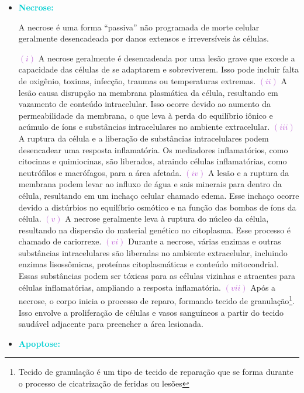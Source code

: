 \documentclass[11pt,a4paper]{article}
\begin{document}
	\begin{itemize}[label=\textcolor{CarnationPink}{$\blacktriangleright$}]
		\item \textcolor{DarkTurquoise}{\LobsterTwo\Large\textbf{Necrose:}}
		
		A necrose é uma forma ``passiva'' não programada de morte celular geralmente desencadeada por danos extensos e irreversíveis às células.

		\textcolor{MediumOrchid}{$(i)$} A necrose geralmente é desencadeada por uma lesão  grave que excede a capacidade das células de se adaptarem e sobreviverem. Isso pode incluir falta de oxigênio, toxinas, infecção, traumas ou temperaturas extremas. \textcolor{MediumOrchid}{$(ii)$} A lesão causa disrupção na membrana plasmática da célula, resultando em vazamento de conteúdo intracelular. Isso ocorre devido ao aumento da permeabilidade da membrana, o que leva à perda do equilíbrio iônico e acúmulo de íons e substâncias intracelulares no ambiente extracelular. \textcolor{MediumOrchid}{$(iii)$} A ruptura da célula e a liberação de substâncias intracelulares podem desencadear uma resposta inflamatória. Os mediadores inflamatórios, como citocinas e quimiocinas, são liberados, atraindo células inflamatórias, como neutrófilos e macrófagos, para a área afetada. \textcolor{MediumOrchid}{$(iv)$} A lesão e a ruptura da membrana podem levar ao influxo de água e sais minerais para dentro da célula, resultando em um inchaço celular chamado edema. Esse inchaço ocorre devido a distúrbios no equilíbrio osmótico e na função das bombas de íons da célula. \textcolor{MediumOrchid}{$(v)$} A necrose geralmente leva à ruptura do núcleo da célula, resultando na dispersão do material genético no citoplasma. Esse processo é chamado de cariorrexe. \textcolor{MediumOrchid}{$(vi)$}  Durante a necrose, várias enzimas e outras substâncias intracelulares são liberadas no ambiente extracelular, incluindo enzimas lisossômicas, proteínas citoplasmáticas e conteúdo mitocondrial. Essas substâncias podem ser tóxicas para as células vizinhas e atraentes para células inflamatórias, ampliando a resposta inflamatória. \textcolor{MediumOrchid}{$(vii)$} Após a necrose, o corpo inicia o processo de reparo, formando tecido de granulação\footnote{Tecido de granulação é um tipo de tecido de reparação que se forma durante o processo de cicatrização de feridas ou lesões}. Isso envolve a proliferação de células e vasos sanguíneos a partir do tecido saudável adjacente para preencher a área lesionada.
		

		\item \textcolor{DarkTurquoise}{\LobsterTwo\Large\textbf{Apoptose:}}
		

\end{itemize}
\end{document}
